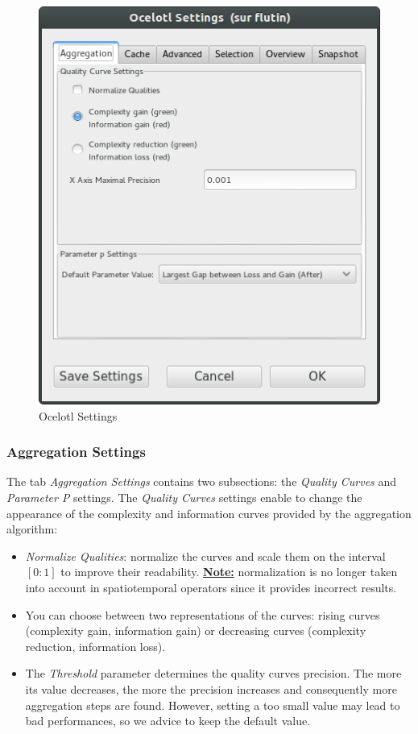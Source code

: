 \documentclass[twoside]{article}
\begin{document}
\begin{sloppypar}
\begin{figure}[h!]
	\centering
	\includegraphics[scale=0.5]{images/ocelotlSettings.png}
	\caption{Ocelotl Settings}
	\label{ocelotlsettings}
\end{figure}

\subsubsection{Aggregation Settings}
The tab \textit{Aggregation Settings} contains two subsections: the \textit{Quality Curves} and \textit{Parameter P} settings. The \textit{Quality Curves} settings enable to change the appearance of the complexity and information curves provided by the aggregation algorithm:
\begin{itemize}
	\item \textit{Normalize Qualities}: normalize the curves and scale them on the interval $[0:1]$ to improve their readability. \underline{\textbf{Note:}} normalization is no longer taken into account in spatiotemporal operators since it provides incorrect results.
    \item You can choose between two representations of the curves: rising curves (complexity gain, information gain) or decreasing curves (complexity reduction, information loss).
    \item The \textit{Threshold} parameter determines the quality curves precision. The more its value decreases, the more the precision increases and consequently more aggregation steps are found. However, setting a too small value may lead to bad performances, so we advice to keep the default value.
\end{itemize}


\end{sloppypar}
\end{document}
